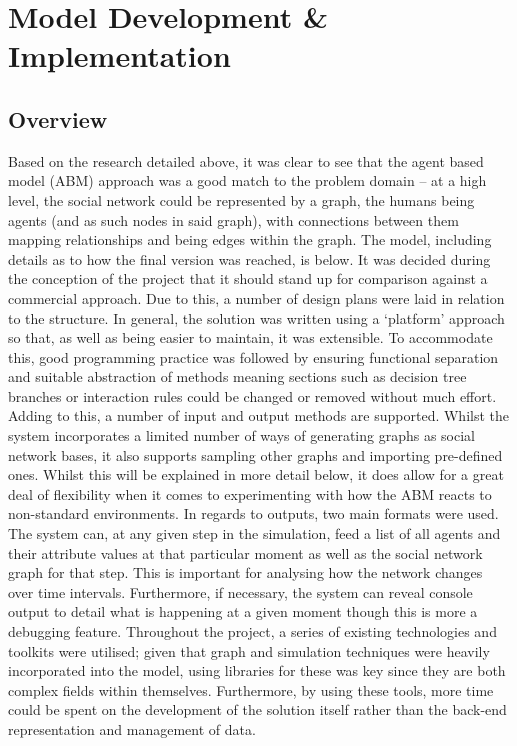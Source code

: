 \documentclass[]{report}
\begin{document}
%
%

%
%
\chapter{Model Development \& Implementation}
\section{Overview}
Based on the research detailed above, it was clear to see that the agent based model (ABM) approach was a good match to the problem domain – at a high level, the social network could be represented by a graph, the humans being agents (and as such nodes in said graph), with connections between them mapping relationships and being edges within the graph. The model, including details as to how the final version was reached, is below.
It was decided during the conception of the project that it should stand up for comparison against a commercial approach. Due to this, a number of design plans were laid in relation to the structure. In general, the solution was written using a `platform' approach so that, as well as being easier to maintain, it was extensible. To accommodate this, good programming practice was followed by ensuring functional separation and suitable abstraction of methods meaning sections such as decision tree branches or interaction rules could be changed or removed without much effort.
Adding to this, a number of input and output methods are supported. Whilst the system incorporates a limited number of ways of generating graphs as social network bases, it also supports sampling other graphs and importing pre-defined ones. Whilst this will be explained in more detail below, it does allow for a great deal of flexibility when it comes to experimenting with how the ABM reacts to non-standard environments. In regards to outputs, two main formats were used. The system can, at any given step in the simulation, feed a list of all agents and their attribute values at that particular moment as well as the social network graph for that step. This is important for analysing how the network changes over time intervals. Furthermore, if necessary, the system can reveal console output to detail what is happening at a given moment though this is more a debugging feature.
Throughout the project, a series of existing technologies and toolkits were utilised; given that graph and simulation techniques were heavily incorporated into the model, using libraries for these was key since they are both complex fields within themselves. Furthermore, by using these tools, more time could be spent on the development of the solution itself rather than the back-end representation and management of data.
\end{document}
